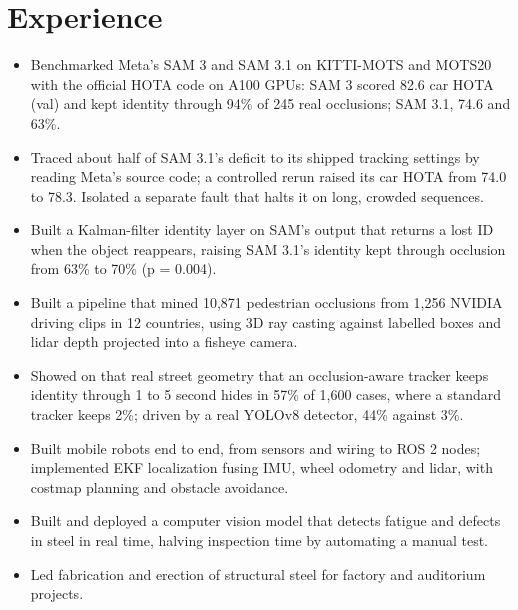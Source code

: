 \documentclass[10pt,letterpaper]{article}
\begin{document}
\section{Experience}
\begin{itemize}
  \item Benchmarked Meta's SAM 3 and SAM 3.1 on KITTI-MOTS and MOTS20 with the official HOTA code on A100 GPUs: SAM 3
        scored 82.6 car HOTA (val) and kept identity through 94\% of 245 real occlusions; SAM 3.1, 74.6 and 63\%.
  \item Traced about half of SAM 3.1's deficit to its shipped tracking settings by reading Meta's source code; a controlled rerun raised
        its car HOTA from 74.0 to 78.3. Isolated a separate fault that halts it on long, crowded sequences.
  \item Built a Kalman-filter identity layer on SAM's output that returns a lost ID when the object reappears, raising SAM 3.1's identity
        kept through occlusion from 63\% to 70\% (p = 0.004).
  \item Built a pipeline that mined 10,871 pedestrian occlusions from 1,256 NVIDIA driving clips in 12 countries, using 3D ray casting
        against labelled boxes and lidar depth projected into a fisheye camera.
  \item Showed on that real street geometry that an occlusion-aware tracker keeps identity through 1 to 5 second hides in 57\% of
        1,600 cases, where a standard tracker keeps 2\%; driven by a real YOLOv8 detector, 44\% against 3\%.
  \item Built mobile robots end to end, from sensors and wiring to ROS 2 nodes; implemented EKF localization fusing IMU, wheel odometry
        and lidar, with costmap planning and obstacle avoidance.
\end{itemize}


\begin{itemize}
  \item Built and deployed a computer vision model that detects fatigue and defects in steel in real time, halving inspection time by
        automating a manual test.
  \item Led fabrication and erection of structural steel for factory and auditorium projects.
\end{itemize}
\end{document}
